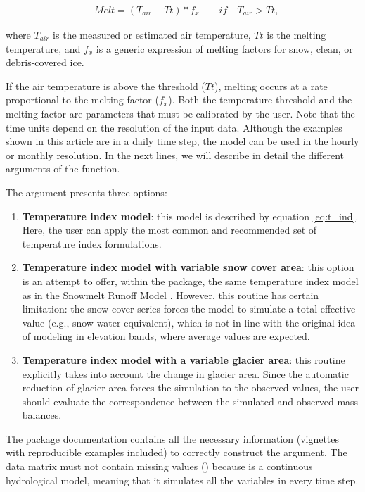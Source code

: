 \begin{align}\label{eq:t_ind}
& Melt = (T_{air} - Tt) * f_{x} \quad \quad \textit{if} \quad T_{air} > Tt ,
\end{align}

\noindent
where $T_{air}$ is the measured or estimated air temperature, $Tt$ is the melting temperature, and $f_{x}$ is a generic expression
of melting factors for snow, clean, or debris-covered ice.

If the air temperature is above the threshold ($Tt$), melting occurs at a rate proportional to the melting factor ($f_{x}$). Both
the temperature threshold and the melting factor are parameters that must be calibrated by the user. Note that the time units
depend on the resolution of the input data. Although the examples shown in this article are in a daily time step, the model can
be used in the hourly or monthly resolution. In the next lines, we will describe in detail the different arguments of the
function.

The  argument presents three options:

\begin{enumerate}
	\item \textbf{Temperature index model}: this model is described by equation \ref{eq:t_ind}. Here, the user can apply
	the most common and recommended set of temperature index formulations.
	\item \textbf{Temperature index model with variable snow cover area}: this option is an attempt to offer, within the package,
	the same temperature index model as in the Snowmelt Runoff Model \citep{dewalle:2008}. However, this routine has certain
	limitation: the snow cover series forces the model to simulate a total effective value (e.g., snow water equivalent), which
	is not in-line with the original idea of modeling in elevation bands, where average values are expected. 
	\item \textbf{Temperature index model with a variable glacier area}: this routine explicitly takes into account the 
	change in glacier area. Since the automatic reduction of glacier area forces the simulation to the observed values,
	the user should evaluate the correspondence between the simulated and observed mass balances.
\end{enumerate}

The package documentation contains all the necessary information (vignettes with reproducible examples included) to 
correctly construct the  argument. The data matrix must not contain missing values () because
 is a continuous hydrological model, meaning that it simulates all the variables in every time step.

